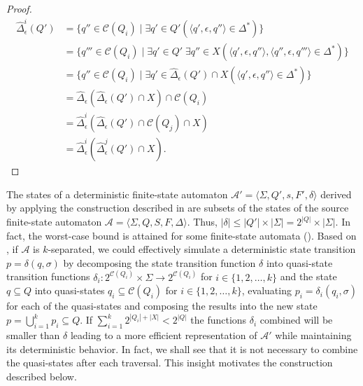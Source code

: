 \begin{proof}
  \begin{align*}
    \hat{\Delta}_\epsilon^i(Q')
    &= \{ q'' \in \mathcal{C}(Q_i) \mid \exists q' \in Q' (\langle q', \epsilon, q''
    \rangle \in \Delta^*) \}\\
    &= \{ q''' \in \mathcal{C}(Q_i) \mid \exists q' \in Q' \; \exists q'' \in X
    (\langle q', \epsilon, q'' \rangle, \langle q'', \epsilon, q''' \rangle \in
    \Delta^*) \}\\
    &= \{ q'' \in \mathcal{C}(Q_i) \mid \exists q' \in \hat{\Delta}_\epsilon(Q') \cap
    X (\langle q', \epsilon, q'' \rangle \in \Delta^*) \}\\
    &= \hat{\Delta}_\epsilon(\hat{\Delta}_\epsilon(Q') \cap X) \cap
    \mathcal{C}(Q_i)\\
    &= \hat{\Delta}_\epsilon^i(\hat{\Delta}_\epsilon(Q') \cap \mathcal{C}(Q_j) \cap
    X)\\
    &= \hat{\Delta}_\epsilon^i(\hat{\Delta}_\epsilon^j(Q') \cap X).
  \end{align*}
\end{proof}

The states of a deterministic finite-state automaton $\mathcal{A'} = \langle \Sigma,
Q', s, F', \delta \rangle$ derived by applying the construction described in
 are subsets of the states of the source finite-state automaton
$\mathcal{A} = \langle \Sigma, Q, S, F, \Delta \rangle$. Thus, $|\delta| \leq |Q'|
\times |\Sigma| = 2^{|Q|} \times |\Sigma|$. In fact, the worst-case bound is attained
for some finite-state automata (). Based on
, if $\mathcal{A}$ is $k$-separated, we could effectively
simulate a deterministic state transition $p = \delta(q, \sigma)$ by decomposing the
state transition function $\delta$ into quasi-state transition functions $\delta_i :
2^{\mathcal{C}(Q_i)} \times \Sigma \rightarrow 2^{\mathcal{C}(Q_i)}$ for $i \in \{
1, 2, \ldots, k \}$ and the state $q \subseteq Q$ into quasi-states $q_i \subseteq
\mathcal{C}(Q_i)$ for $i \in \{ 1, 2, \ldots, k \}$, evaluating $p_i = \delta_i(q_i,
\sigma)$ for each of the quasi-states and composing the results into the new state
$p = \bigcup_{i=1}^k p_i \subseteq Q$. If $\sum_{i=1}^k 2^{|Q_i| + |X|} < 2^{|Q|}$
the functions $\delta_i$ combined will be smaller than $\delta$ leading to a more
efficient representation of $\mathcal{A'}$ while maintaining its deterministic
behavior. In fact, we shall see that it is not necessary to combine the quasi-states
after each traversal. This insight motivates the construction described below.

